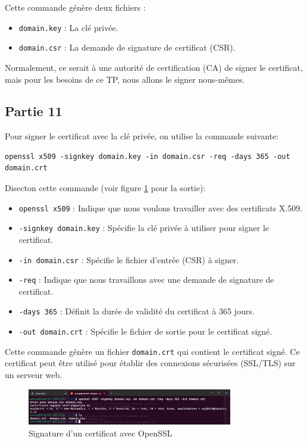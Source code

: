 \documentclass[12pt,a4paper]{article}
\begin{document}
Cette commande génère deux fichiers :
\begin{itemize}
    \item \texttt{domain.key} : La clé privée.
    \item \texttt{domain.csr} : La demande de signature de certificat (CSR).
\end{itemize}

Normalement, ce serait à une autorité de certification (CA) de signer le certificat,
mais pour les besoins de ce TP, nous allons le signer nous-mêmes.

\subsection{Partie 11}
Pour signer le certificat avec la clé privée, on utilise la commande suivante:
\begin{Verbatim}[fontsize=\footnotesize]
    openssl x509 -signkey domain.key -in domain.csr -req -days 365 -out domain.crt
\end{Verbatim}

Disecton cette commande (voir figure \ref{opensslCertSign} pour la sortie):
\begin{itemize}
    \item \texttt{openssl x509} : Indique que nous voulons travailler avec des certificats X.509.
    \item \texttt{-signkey domain.key} : Spécifie la clé privée à utiliser pour signer le certificat.
    \item \texttt{-in domain.csr} : Spécifie le fichier d'entrée (CSR) à signer.
    \item \texttt{-req} : Indique que nous travaillons avec une demande de signature de certificat.
    \item \texttt{-days 365} : Définit la durée de validité du certificat à 365 jours.
    \item \texttt{-out domain.crt} : Spécifie le fichier de sortie pour le certificat signé.
\end{itemize}

Cette commande génère un fichier \texttt{domain.crt} qui contient le certificat signé.
Ce certificat peut être utilisé pour établir des connexions sécurisées (SSL/TLS) sur un serveur web.

\begin{figure}[ht]
    \centering
    \includegraphics[width=0.8\textwidth]{../img/opensslCertSign.png}
    \caption{Signature d'un certificat avec OpenSSL}
    \label{opensslCertSign}
\end{figure}
\end{document}
